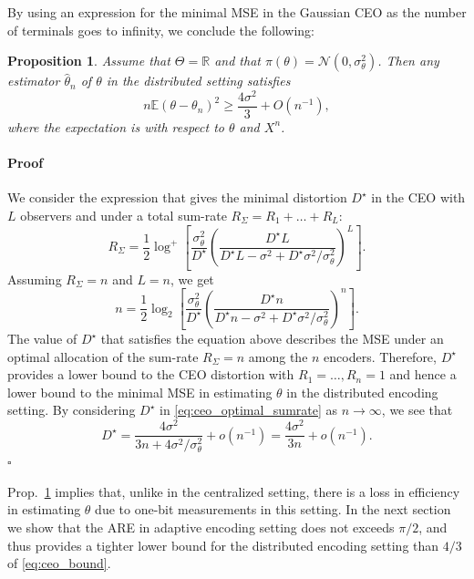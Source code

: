 \documentclass[letterpaper, conference]{IEEEtran}      %
\newtheorem{prop}[thm]{\bf {Proposition}}
\newenvironment{proof}{\paragraph*{Proof}}{\hfill$\square$ \newline}
\begin{document}
By using an expression for the minimal MSE in the Gaussian CEO as the number of terminals goes to infinity, we conclude the following:
\begin{prop} \label{prop:ceo_lower_bound}
Assume that $\Theta = \mathbb R$ and that $\pi(\theta) = \mathcal N(0,\sigma_\theta^2)$. Then any estimator $\widehat{\theta}_n$ of $\theta$ in the distributed setting satisfies
\begin{equation} \label{eq:ceo_bound}
 n\mathbb E \left( \theta - \theta_n \right)^2 \geq \frac{4\sigma^2}{3} + O(n^{-1}),
\end{equation}
where the expectation is with respect to $\theta$ and $X^n$.
\end{prop}

\begin{proof}
We consider the expression \cite[Eq. 10]{chen2004upper} that gives the minimal distortion $D^\star$ in the CEO with $L$ observers and under a total sum-rate $R_\Sigma = R_1 + \ldots +R_L$:
\begin{equation} \label{eq:ceo_optimal_sumrate}
R_{\Sigma} = \frac{1}{2} \log^+ \left[ \frac{\sigma_\theta^2}{D^\star} \left( \frac{D^\star L}{ D^\star L - \sigma^2 + D^\star \sigma^2 / \sigma_\theta^2 }\right)^L  \right].
\end{equation}
Assuming $R_\Sigma = n$ and $L=n$, we get
\begin{equation} \label{eq:ceo_optimal_sumrate}
n = \frac{1}{2} \log_2 \left[ \frac{\sigma_\theta^2}{D^\star} \left(\frac{ D^\star n }{D^\star n - \sigma^2 + D^\star \sigma^2/\sigma_\theta^2 }  \right)^n  \right].
\end{equation}
The value of $D^\star$ that satisfies the equation above describes the MSE under an optimal allocation of the sum-rate $R_\Sigma = n$ among the $n$ encoders. Therefore, $D^\star$ provides a lower bound to the CEO distortion with $R_1=\ldots,R_n = 1$ and hence a lower bound to the minimal MSE in estimating $\theta$ in the distributed encoding setting. By considering $D^\star$ in \eqref{eq:ceo_optimal_sumrate} as $n\rightarrow \infty$, we see that 
\[
D^\star = \frac{ 4\sigma^2 }{3n + 4 \sigma^2 / \sigma_\theta^2 } + o(n^{-1}) =  \frac{4\sigma^2}{3n} + o(n^{-1}). 
\]
\end{proof}

Prop.~\ref{prop:ceo_lower_bound} implies that, unlike in the centralized setting, there is a loss in efficiency in estimating $\theta$ due to one-bit measurements in this setting. In the next section we show that the ARE in adaptive encoding setting does not exceeds $\pi/2$, and thus provides a tighter lower bound for the distributed encoding setting than $4/3$ of  \eqref{eq:ceo_bound}. \\
\end{document}
